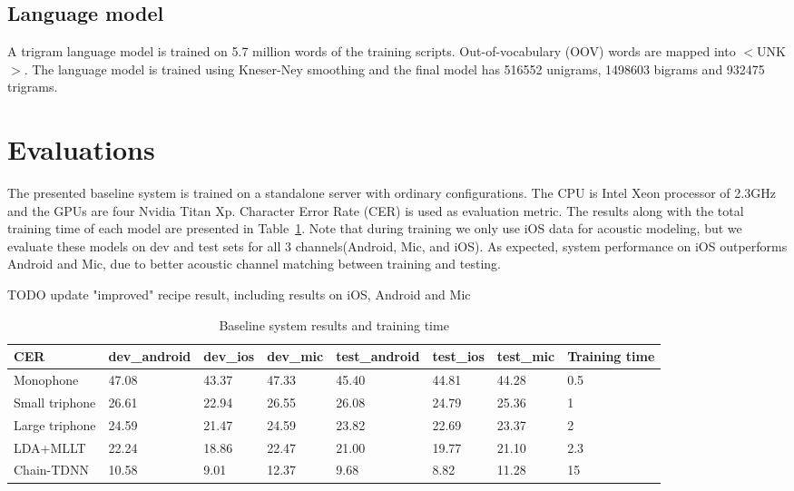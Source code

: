 \documentclass[a4paper]{article}
\begin{document}
\subsection{Language model}

A trigram language model is trained on 5.7 million words of the training
scripts. Out-of-vocabulary (OOV) words are mapped into $<$UNK$>$. The language
model is trained using Kneser-Ney smoothing and the final model has 516552
unigrams, 1498603 bigrams and 932475 trigrams.

\section{Evaluations}

The presented baseline system is trained on a standalone server with ordinary
configurations. The CPU is Intel Xeon processor of 2.3GHz and the GPUs are four
Nvidia Titan Xp. Character Error Rate (CER) is used as evaluation metric. 
The results along with the total training time of each model are presented in Table~\ref{tab:base}. 
Note that during training we only use iOS data for acoustic modeling, but we evaluate
these models on dev and test sets for all 3 channels(Android, Mic, and iOS). As
expected, system performance on iOS outperforms Android and Mic, due to better
acoustic channel matching between training and testing.

TODO update "improved" recipe result, including results on iOS, Android and Mic

\begin{table}[th]
  \caption{Baseline system results and training time}
  \label{tab:base}
  \centering
  \begin{tabular}{ llllllll }
    \toprule
    CER               &  dev\_android           &  dev\_ios           &  dev\_mic           & test\_android            &  test\_ios           &  test\_mic          &  Training time         \\
    \midrule
    Monophone        &  47.08                 &  43.37             &  47.33             &  45.40                  &  44.81              &  44.28             &  0.5                   \\
    Small triphone    &  26.61                 &  22.94             &  26.55             &  26.08                  &  24.79              &  25.36             &  1                     \\
    Large triphone    &  24.59                 &  21.47             &  24.59             &  23.82                 &  22.69              &  23.37             &  2                     \\
    LDA+MLLT          &  22.24                 &  18.86             &  22.47             &  21.00                  &  19.77              &  21.10             &  2.3                   \\
    Chain-TDNN              &  10.58                 &  9.01             &  12.37         &  9.68                  &  8.82             &  11.28              &  15                    \\
    \bottomrule
  \end{tabular}
\end{table}
\end{document}
